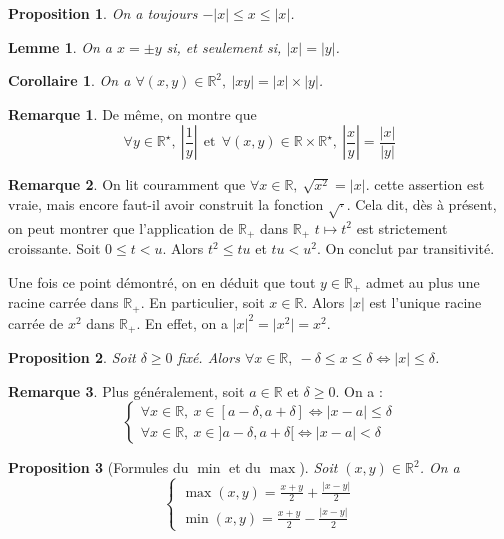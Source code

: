 \documentclass[french]{book}
\newcommand{\R}{\mathbb{R}}
\newcommand{\st}{^\star}
\theoremstyle{plain}
\newtheorem{lem}{Lemme}[chapter]
\newtheorem{prop}{Proposition}[chapter]
\newtheorem{cor}{Corollaire}[chapter]
\theoremstyle{definition}
\newtheorem{rmq}{Remarque}[chapter]
\theoremstyle{remark}
\begin{document}
\begin{prop}
	On a toujours $-\lvert x\rvert\leqslant x\leqslant \lvert x\rvert$.
\end{prop}
\begin{lem}
	On a $x=\pm y$ si, et seulement si, $\lvert x\rvert =\lvert y\rvert$.
\end{lem}
\begin{cor}
	On a $\forall(x,y)\in\R^2,\ \lvert xy\rvert=\lvert x\rvert\times\lvert y\rvert$.
\end{cor}
\begin{rmq}
	De même, on montre que $$\forall y\in\R\st,\ \left\lvert\frac{1}{y}\right\rvert \ \ \text{et} \ \ \forall(x,y)\in\R\times\R\st,\ \left\lvert\frac{x}{y}\right\rvert=\frac{\lvert x\rvert}{\lvert y\rvert}$$
\end{rmq}
\begin{rmq}
	On lit couramment que $\forall x\in\R,\ \sqrt{x^2}=\lvert x\rvert$. cette assertion est vraie, mais encore faut-il avoir construit la fonction $\sqrt{\cdot}$. Cela dit, dès à présent, on peut montrer que l'application de $\R_+$ dans $\R_+$ $t\mapsto t^2$ est strictement croissante. Soit $0\leqslant t< u$. Alors $t^2\leqslant tu$ et $tu< u^2$. On conclut par transitivité. \par Une fois ce point démontré, on en déduit que tout $y\in\R_+$ admet au plus une racine carrée dans $\R_+$. En particulier, soit $x\in\R$. Alors $\lvert x\rvert$ est l'unique racine carrée de $x^2$ dans $\R_+$. En effet, on a $\lvert x\rvert^2=\lvert x^2\rvert=x^2$.
\end{rmq}
\begin{prop}
	Soit $\delta\geqslant0$ fixé. Alors $\forall x\in\R,\ -\delta\leqslant x\leqslant\delta\iff\lvert x\rvert\leqslant\delta$.
\end{prop}
\begin{rmq}
	Plus généralement, soit $a\in\R$ et $\delta\geqslant0$. On a : $$\left \{\begin{array}{ll}\forall x\in\R,\ x\in[a-\delta,a+\delta]\iff\lvert x-a\rvert\leqslant\delta\\ \forall x\in\R,\ x\in]a-\delta,a+\delta[\iff\lvert x-a\rvert<\delta \end{array}\right.$$
\end{rmq}
\begin{prop}[Formules du $\min$ et du $\max$]
	Soit $(x,y)\in\R^2$. On a $$\left \{\begin{array}{ll}\displaystyle\max(x,y)=\frac{x+y}{2}+\frac{\lvert x-y\rvert}{2} \\[4mm] \displaystyle\min(x,y)=\frac{x+y}{2}-\frac{\lvert x-y\rvert}{2}\end{array}\right.$$
\end{prop}
\end{document}
